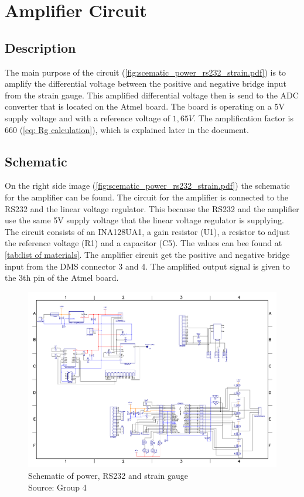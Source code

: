 \documentclass[a4paper,12pt]{scrreprt}
\begin{document}
\section{Amplifier Circuit}\label{sec: amplifier circuit}
\subsection{Description}
The main purpose of the circuit (\autoref{fig:scematic_power_rs232_strain.pdf}) is to amplify the differential voltage between the positive and negative bridge input from the strain gauge. This amplified differential voltage then is send to the \acs{ADC} converter that is located on the Atmel board. The board is operating on a 5V supply voltage and with a reference voltage of $1,65V$. The amplification factor is $660$ (\autoref{eq: Rg calculation}), which is explained later in the document. 

\subsection{Schematic}
On the right side image (\autoref{fig:scematic_power_rs232_strain.pdf}) the schematic for the amplifier can be found. The circuit for the amplifier is connected to the \acs{RS232} and the linear voltage regulator. This because the \acs{RS232} and the amplifier use the same 5V supply voltage that the linear voltage regulator is supplying. The circuit consists of an INA128UA1, a gain resistor (U1), a resistor to adjust the reference voltage (R1) and a capacitor (C5). The values can bee found at \autoref{tab:list of materials}. The amplifier circuit get the positive and negative bridge input from the DMS connector 3 and 4. The amplified output signal is given to the 3th pin of the Atmel board.

\begin{figure}[H]
  \centering
   \includegraphics[width=1\textwidth]{pictures/scematic_power_rs232_strain.pdf}
   \caption[Schematic of power, \acs{RS232} and strain gauge]{Schematic of power, \acs{RS232} and strain gauge\\
	Source: Group 4  
  }
   \label{fig:scematic_power_rs232_strain.pdf}
\end{figure} 
\end{document}
